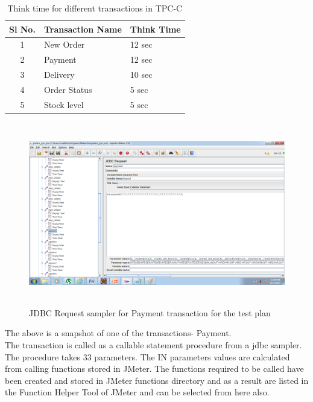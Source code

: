 \documentclass[12pt]{book}
\begin{document}
  \begin{table}[h]
   \begin{center}
    \begin{tabular}{|c|l|p{5cm}|} 
    \hline
    \textbf{Sl No.} & \textbf{Transaction Name} & \textbf{Think Time}\\
    \hline
    1 & New Order & 12 sec \\
    \hline
    2 & Payment & 12 sec \\
   \hline
    3 & Delivery & 10 sec \\
    \hline
    4 & Order Status & 5 sec \\
    \hline
    5 & Stock level & 5 sec \\
    \hline    
    \end{tabular}
    \caption{Think time for different transactions in TPC-C}
   \end{center}
  \end{table}
  
   \begin{figure}[H]
    \centering
    \includegraphics[width=15cm, height=8cm]{images/ntpcc_90}
    \caption{JDBC Request sampler for Payment transaction for the test plan\label{fig:fig74_JMeter}}
   \end{figure}
   
   The above is a snapshot of one of the transactions- Payment.\\
   The transaction is called as a callable statement procedure from a jdbc sampler. The procedure
   takes 33 parameters. The IN parameters values are calculated from calling functions stored in
   JMeter. The functions required to be called have been created and stored in JMeter functions
   directory and as a result are listed in the Function Helper Tool of JMeter and can be selected from
   here also.
   
\end{document}
